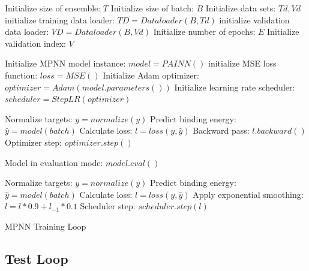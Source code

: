 \begin{algorithm}[H]
    \begin{algorithmic}[1]
        \State Initialize size of ensemble: $T$
        \State Initialize size of batch: $B$
        \State Initialize data sets: $Td, Vd$
        \State initialize training data loader: $TD = Dataloader(B,Td)$
        \State initialize validation data loader: $VD = Dataloader(B,Vd)$
        \State Initialize number of epochs: $E$
        \State Initialize validation index: $V$


        \State Initialize MPNN model instance: $model = PAINN()$
        \State initialize MSE loss function: $loss = MSE()$
        \State Initialize Adam optimizer: $optimizer = Adam(model.parameters())$
        \State Initialize learning rate scheduler: $scheduler = StepLR(optimizer)$



        \State Normalize targets: $y = normalize(y)$
        \State Predict binding energy: $\hat{y} = model(batch)$
        \State Calculate loss: $l = loss(y,\hat{y})$
        \State Backward pass: $l.backward()$
        \State Optimizer step: $optimizer.step()$

        \State Model in evaluation mode: $model.eval()$


        \State Normalize targets: $y = normalize(y)$
        \State Predict binding energy: $\hat{y} = model(batch)$
        \State Calculate loss: $l = loss(y,\hat{y})$
        \State Apply exponential smoothing: $l = l * 0.9 + l_{-1} * 0.1$
        \State Scheduler step: $scheduler.step(l)$
        \EndFor

        \EndIf
        \EndFor
        \EndFor
        \EndFor
    \end{algorithmic}
    \caption{MPNN Training Loop}
    \label{algo:MPNN_training}
\end{algorithm}

\subsection{Test Loop}\label{subsec:test}

